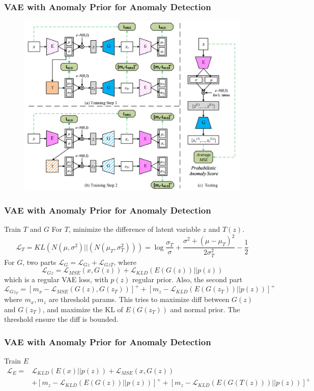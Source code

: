 \documentclass{beamer}
\begin{document}
\begin{frame}
\begin{frame}
\begin{frame}
\begin{frame}
\begin{frame}
\frametitle{VAE with Anomaly Prior for Anomaly Detection}
\begin{figure}
\includegraphics[width=0.8\linewidth]{figs/vae_anomaly_prior.png}
\end{figure}
\end{frame}

\begin{frame}
\frametitle{VAE with Anomaly Prior for Anomaly Detection}

\begin{block}{Train $T$ and $G$}
For $T$, minimize the difference of latent variable $z$ and $T(z)$.
\[
\mathcal{L}_T = KL(N(\mu, \sigma^2)||(N(\mu_T, \sigma_T^2))) = \log\frac{\sigma_T}{\sigma} + \frac{\sigma^2 + (\mu-\mu_T)^2}{2\sigma_T^2} - \frac{1}{2} 
\]
For $G$, two parts $\mathcal{L}_G = \mathcal{L}_{Gz} + \mathcal{L}_{GzT}$, where
\[
\mathcal{L}_{Gz} = \mathcal{L}_{MSE}(x, G(z)) + \mathcal{L}_{KLD}(E(G(z))||p(z))
\]
which is a regular VAE loss, with $p(z)$ regular prior. Also, the second part
\[
\mathcal{L}_{Gz_T} = [m_x - \mathcal{L}_{MSE}(G(z), G(z_T))]^+ + [m_z - \mathcal{L}_{KLD}(E(G(z_T))||p(z))]^+
\]
where $m_x,m_z$ are threshold params. This tries to maximize diff between $G(z)$ and $G(z_T)$, and maximize the KL of $E(G(z_T))$ and normal prior. The threshold ensure the diff is bounded.
\end{block}
\end{frame}


\begin{frame}
\frametitle{VAE with Anomaly Prior for Anomaly Detection}

\begin{block}{Train $E$}
\[
\begin{split}
\mathcal{L}_E =& \mathcal{L}_{KLD}(E(x)||p(z)) + \mathcal{L}_{MSE}(x, G(z)) \\
& + [m_z-\mathcal{L}_{KLD}(E(G(z))||p(z))]^+ + [m_z-\mathcal{L}_{KLD}(E(G(T(z)))||p(z))]^+
\end{split}
\]


\end{block}
\end{frame}
\end{frame}
\end{frame}
\end{frame}
\end{frame}
\end{document}
